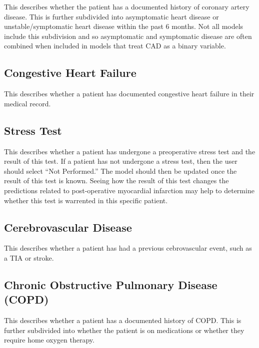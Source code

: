 \documentclass[
]{book}
\begin{document}
This describes whether the patient has a documented history of coronary artery disease. This is further subdivided into asymptomatic heart disease or unstable/symptomatic heart disease within the past 6 months. Not all models include this subdivision and so asymptomatic and symptomatic disease are often combined when included in models that treat CAD as a binary variable.

\hypertarget{congestive-heart-failure}{%
\subsection{Congestive Heart Failure}\label{congestive-heart-failure}}

This describes whether a patient has documented congestive heart failure in their medical record.

\hypertarget{stress-test}{%
\subsection{Stress Test}\label{stress-test}}

This describes whether a patient has undergone a preoperative stress test and the result of this test. If a patient has not undergone a stress test, then the user should select ``Not Performed.'' The model should then be updated once the result of this test is known. Seeing how the result of this test changes the predictions related to post-operative myocardial infarction may help to determine whether this test is warrented in this specific patient.

\hypertarget{cerebrovascular-disease}{%
\subsection{Cerebrovascular Disease}\label{cerebrovascular-disease}}

This describes whether a patient has had a previous cebrovascular event, such as a TIA or stroke.

\hypertarget{chronic-obstructive-pulmonary-disease-copd}{%
\subsection{Chronic Obstructive Pulmonary Disease (COPD)}\label{chronic-obstructive-pulmonary-disease-copd}}

This describes whether a patient has a documented history of COPD. This is further subdivided into whether the patient is on medications or whether they require home oxygen therapy.
\end{document}
